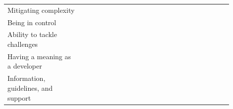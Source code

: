\documentclass[english, 12pt, a4paper, sci, utf8, a-1b, online]{aaltothesis}
\begin{document}
\begin{center}
\begin{longtable}{p{0.3\linewidth}p{0.6\linewidth}}
    Mitigating complexity                   & \textcite{fontao2017facing} \newline \textcite{nebeling2013informing} \newline \textcite{miranda2018improving}                                                                                                                                                                                                               \\
    Being in control                        & \textcite{software-developers-as-users} \newline \textcite{silva-comparing} \newline \textcite{myers2016improving} \newline \textcite{macvean2016api}                                                                                                                                                                        \\
    Ability to tackle challenges            & \textcite{pinter2019polymorph} \newline \textcite{ivo2018approach} \newline \textcite{zhang2018toward} \newline \textcite{what-happens-when-unhappy}                                                                                                                                                                         \\
    Having a meaning as a developer         & \textcite{fagerholm2014examining} \newline \textcite{fontao2017investigating}                                                                                                                                                                                                                                                \\
    Information, guidelines, and support    & \textcite{de2017towards} \newline \textcite{myers2016improving} \newline \textcite{macvean2016api} \newline \textcite{claussen2019role} \newline \textcite{chatley2019supporting} \newline \textcite{nazariodetecting} \newline \textcite{henriques2018improving} \newline \textcite{fontao2018mobile}                       \\

\end{longtable}
\end{center}
\end{document}

